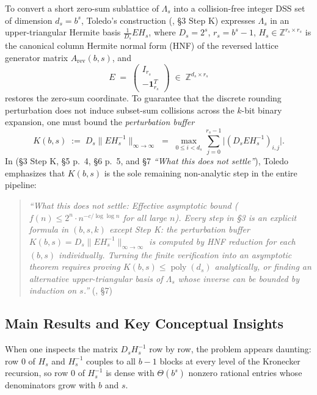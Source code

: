 \documentclass[11pt,a4paper]{article}
\theoremstyle{plain}
\theoremstyle{definition}
\newcommand{\Z}{\mathbb{Z}}
\newcommand{\rev}{\operatorname{rev}}
\newcommand{\poly}{\operatorname{poly}}
\begin{document}
To convert a short zero-sum sublattice of $\Lambda_s$ into a collision-free integer DSS set of dimension $d_s = b^s$, Toledo's construction (\cite{Toledo26}, \S 3 Step K) expresses $\Lambda_s$ in an upper-triangular Hermite basis $\frac{1}{D_s} E H_s$, where $D_s = 2^s$, $r_s = b^s - 1$, $H_s \in \Z^{r_s \times r_s}$ is the canonical column Hermite normal form (HNF) of the reversed lattice generator matrix $A_{\rev}(b,s)$, and
\[
E \;=\; \begin{pmatrix} I_{r_s} \\ -\mathbf{1}_{r_s}^T \end{pmatrix} \;\in\; \Z^{d_s \times r_s}
\]
restores the zero-sum coordinate. To guarantee that the discrete rounding perturbation does not induce subset-sum collisions across the $k$-bit binary expansion, one must bound the \emph{perturbation buffer}
\begin{equation}\label{eq:K-def}
K(b,s) \;:=\; D_s \|E H_s^{-1}\|_{\infty \to \infty} \;=\; \max_{0 \le i < d_s} \sum_{j=0}^{r_s-1} \big|(D_s E H_s^{-1})_{i,j}\big|.
\end{equation}
In \cite{Toledo26} (\S 3 Step K, \S 5 p.~4, \S 6 p.~5, and \S 7 \emph{``What this does not settle''}), Toledo emphasizes that $K(b,s)$ is the sole remaining non-analytic step in the entire pipeline:
\begin{quote}
\emph{``What this does not settle: Effective asymptotic bound ($f(n) \le 2^n \cdot n^{-c/\log\log n}$ for all large $n$). Every step in \S 3 is an explicit formula in $(b,s,k)$ except Step K: the perturbation buffer $K(b,s) = D_s \|E H_s^{-1}\|_{\infty \to \infty}$ is computed by HNF reduction for each $(b,s)$ individually. Turning the finite verification into an asymptotic theorem requires proving $K(b,s) \le \poly(d_s)$ analytically, or finding an alternative upper-triangular basis of $\Lambda_s$ whose inverse can be bounded by induction on $s$.''} (\cite{Toledo26}, \S 7)
\end{quote}

\subsection{Main Results and Key Conceptual Insights}

When one inspects the matrix $D_s H_s^{-1}$ row by row, the problem appears daunting: row $0$ of $H_s$ and $H_s^{-1}$ couples to all $b-1$ blocks at every level of the Kronecker recursion, so row $0$ of $H_s^{-1}$ is dense with $\Theta(b^s)$ nonzero rational entries whose denominators grow with $b$ and $s$.
\end{document}

